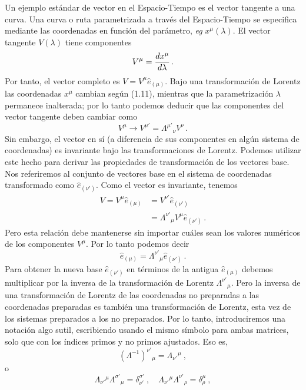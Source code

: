 \documentclass[11pt,b5paper,openany,twoside]{book}
\newcommand{\e}[1]{\hat{e}_{(#1)}}
\begin{document}
Un ejemplo estándar de vector en el Espacio-Tiempo es el vector tangente a una curva.
Una curva o ruta parametrizada a través del Espacio-Tiempo se especifica mediante las coordenadas en función del parámetro, {\it eg} $x^\mu(\lambda)$.
El vector tangente $V(\lambda)$ tiene componentes
\begin{equation}
V^\mu = {{dx^\mu}\over{d\lambda}}\,.\label{1.24}
\end{equation}
Por tanto, el vector completo es $V=V^\mu\e\mu$.
Bajo una transformación de Lorentz las coordenadas $x^\mu$ cambian según (1.11), mientras que la parametrización $\lambda$ permanece inalterada; por lo tanto podemos deducir que las componentes del vector tangente deben cambiar como
\begin{equation}
V^\mu \rightarrow V^{\mu'} = \Lambda^{\mu'}{}_\nu V^\nu\,.\label{1.25}
\end{equation}
Sin embargo, el vector en sí (a diferencia de sus componentes en algún sistema de coordenadas) es invariante bajo las transformaciones de Lorentz.
Podemos utilizar este hecho para derivar las propiedades de transformación de los vectores base.
Nos referiremos al conjunto de vectores base en el sistema de coordenadas transformado como $\e{\nu'}$.
Como el vector es invariante, tenemos
\begin{align}
V = V^\mu\e\mu &=  V^{\nu'}\e{\nu'}\nonumber \\
&=  \Lambda^{\nu'}{}_\mu V^\mu\e{\nu'}\,.\label{1.26}
\end{align}
Pero esta relación debe mantenerse sin importar cuáles sean los valores numéricos de los componentes $V^\mu$.
Por lo tanto podemos decir
\begin{equation}
\e\mu = \Lambda^{\nu'}{}_\mu\e{\nu'}\,.\label{1.27}
\end{equation}
Para obtener la nueva base $\e{\nu'}$ en términos de la antigua $\e\mu$ debemos multiplicar por la inversa de la transformación de Lorentz $\Lambda^{\nu'}{}_\mu$.
Pero la inversa de una transformación de Lorentz de las coordenadas no preparadas a las coordenadas preparadas es también una transformación de Lorentz, esta vez de los sistemas preparados a los no preparados.
Por lo tanto, introduciremos una notación algo sutil, escribiendo usando el mismo símbolo para ambas matrices, solo que con los índices primos y no primos ajustados.
Eso es,
\begin{equation}
(\Lambda^{-1})^{\nu'}{}_\mu = \Lambda_{\nu'}{}^\mu\ ,\label{1.28}
\end{equation}
o
\begin{equation}
\Lambda_{\nu'}{}^\mu \Lambda^{\sigma'}{}_\mu = \delta^{\sigma'}_{\nu'}
\ ,\quad \Lambda_{\nu'}{}^\mu \Lambda^{\nu'}{}_\rho =
\delta^{\mu}_{\rho}\ ,\label{1.29}
\end{equation}
\end{document}
